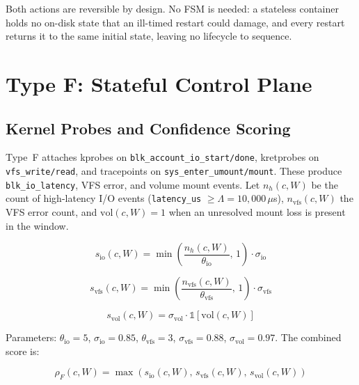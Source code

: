\documentclass[conference]{IEEEtran}
\begin{document}
Both actions are reversible by design. No FSM is needed: a stateless container holds no on-disk state that an ill-timed restart could damage, and every restart returns it to the same initial state, leaving no lifecycle to sequence.


\section{Type F: Stateful Control Plane}
\label{sec:typef}

\subsection{Kernel Probes and Confidence Scoring}

Type~F attaches kprobes on \texttt{blk\_account\_io\_start/\allowbreak done}, kretprobes on \texttt{vfs\_write/\allowbreak read}, and tracepoints on \texttt{sys\_enter\_\allowbreak umount/\allowbreak mount}. These produce \texttt{blk\_io\_latency}, VFS error, and volume mount events. Let $n_h(c, W)$ be the count of high-latency I/O events (\texttt{latency\_us} $\geq \Lambda = 10{,}000\,\mu$s), $n_{\mathrm{vfs}}(c, W)$ the VFS error count, and $\mathrm{vol}(c, W) = 1$ when an unresolved mount loss is present in the window.

\begin{equation}
s_{\mathrm{io}}(c, W) = \min\!\left(\frac{n_h(c, W)}{\theta_{\mathrm{io}}},\, 1\right) \cdot \sigma_{\mathrm{io}}
\label{eq:sio}
\end{equation}

\begin{equation}
s_{\mathrm{vfs}}(c, W) = \min\!\left(\frac{n_{\mathrm{vfs}}(c, W)}{\theta_{\mathrm{vfs}}},\, 1\right) \cdot \sigma_{\mathrm{vfs}}
\label{eq:svfs}
\end{equation}

\begin{equation}
s_{\mathrm{vol}}(c, W) = \sigma_{\mathrm{vol}} \cdot \mathds{1}\!\left[\mathrm{vol}(c, W)\right]
\label{eq:svol}
\end{equation}

Parameters: $\theta_{\mathrm{io}} = 5$, $\sigma_{\mathrm{io}} = 0.85$, $\theta_{\mathrm{vfs}} = 3$, $\sigma_{\mathrm{vfs}} = 0.88$, $\sigma_{\mathrm{vol}} = 0.97$. The combined score is:

\begin{equation}
\rho_F(c, W) = \max(s_{\mathrm{io}}(c, W),\, s_{\mathrm{vfs}}(c, W),\, s_{\mathrm{vol}}(c, W))
\label{eq:rhoF}
\end{equation}
\end{document}

